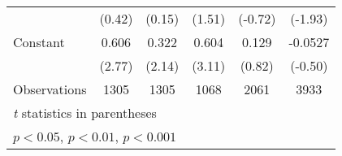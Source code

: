 {\begin{tabular*}{\linewidth}{@{\hskip\tabcolsep\extracolsep\fill}l*{5}{c}}
                &   (0.42)         &   (0.15)         &   (1.51)         &  (-0.72)         &  (-1.93)         \\
\addlinespace
Constant        &    0.606\sym{**} &    0.322\sym{*}  &    0.604\sym{**} &    0.129         &  -0.0527         \\
                &   (2.77)         &   (2.14)         &   (3.11)         &   (0.82)         &  (-0.50)         \\
\midrule
Observations    &     1305         &     1305         &     1068         &     2061         &     3933         \\
\bottomrule
\multicolumn{6}{l}{\footnotesize \textit{t} statistics in parentheses}\\
\multicolumn{6}{l}{\footnotesize \sym{*} \(p<0.05\), \sym{**} \(p<0.01\), \sym{***} \(p<0.001\)}\\
\end{tabular*}
}
